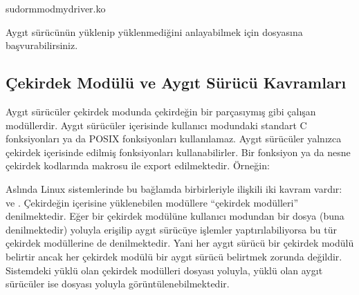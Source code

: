 \documentclass[a4paper,10pt,turkish]{sphinxmanual}
\begin{document}
\begin{sphinxVerbatim}[commandchars=\\\{\}]
\PYGZdl{}sudormmodmydriver.ko
\end{sphinxVerbatim}

\sphinxAtStartPar
Aygıt sürücünün yüklenip yüklenmediğini anlayabilmek için  dosyasına başvurabilirsiniz.


\subsection{Çekirdek Modülü ve Aygıt Sürücü Kavramları}
\label{\detokenize{processcontrolblock:cekirdek-modulu-ve-aygit-surucu-kavramlari}}
\sphinxAtStartPar
Aygıt sürücüler çekirdek modunda çekirdeğin bir parçasıymış gibi çalışan modüllerdir. Aygıt sürücüler
içerisinde kullanıcı modundaki standart C fonksiyonları ya da POSIX fonksiyonları kullanılamaz. Aygıt
sürücüler yalnızca çekirdek içerisinde  edilmiş fonksiyonları kullanabilirler. Bir fonksiyon ya
da nesne çekirdek kodlarında  makrosu ile export edilmektedir. Örneğin:

\begin{sphinxVerbatim}[commandchars=\\\{\}]
\end{sphinxVerbatim}

\sphinxAtStartPar
Aslında Linux sistemlerinde bu bağlamda birbirleriyle ilişkili iki kavram vardır:  ve . Çekirdeğin içerisine yüklenebilen modüllere
“çekirdek modülleri” denilmektedir. Eğer bir çekirdek modülüne kullanıcı modundan bir dosya (buna  denilmektedir) yoluyla erişilip aygıt sürücüye işlemler yaptırılabiliyorsa bu tür
çekirdek modüllerine  de denilmektedir. Yani her aygıt sürücü bir çekirdek
modülü belirtir ancak her çekirdek modülü bir aygıt sürücü belirtmek zorunda değildir. Sistemdeki yüklü
olan çekirdek modülleri  dosyası yoluyla, yüklü olan aygıt sürücüler ise
 dosyası yoluyla görüntülenebilmektedir.
\end{document}
